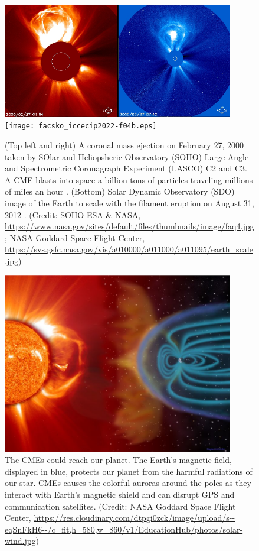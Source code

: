 \documentclass[sn-aps]{sn-jnl}%
\begin{document}
\begin{figure}[h]
\centering
\includegraphics[width=0.9\textwidth]{facsko_iccecip2022-f04a.eps}
\texttt{[image: facsko\_iccecip2022-f04b.eps]}
\caption{(Top left and right) A coronal mass ejection on February 27, 2000 taken by SOlar and Heliopsheric Observatory (SOHO) Large Angle and Spectrometric Coronagraph Experiment (LASCO) C2 and C3. A CME blasts into space a billion tons of particles traveling millions of miles an hour \cite{brueckner95:_large_angle_spect_coron_lasco,domingo95:_soho}. (Bottom) Solar Dynamic Observatory (SDO) image of the Earth to scale with the filament eruption on August 31, 2012 \cite{pesnell12:_solar_dynam_obser_sdo}. (Credit: SOHO ESA \& NASA, \url{https://www.nasa.gov/sites/default/files/thumbnails/image/faq4.jpg}; NASA Goddard Space Flight Center, \url{https://svs.gsfc.nasa.gov/vis/a010000/a011000/a011095/earth\_scale.jpg})}\label{fig:cme}
\end{figure}

\begin{figure}[h]
\centering
\includegraphics[width=0.9\textwidth]{facsko_iccecip2022-f05.eps}
\caption{The CMEs could reach our planet. The Earth's magnetic field, displayed in blue, protects our planet from the harmful radiations of our star. CMEs causes the colorful auroras around the poles as they interact with Earth's magnetic shield and can disrupt GPS and communication satellites. (Credit: NASA Goddard Space Flight Center, \url{https://res.cloudinary.com/dtpgi0zck/image/upload/s--eqSnFkH6--/c_fit,h_580,w_860/v1/EducationHub/photos/solar-wind.jpg})}\label{fig:cmeearth}
\end{figure}
\end{document}
